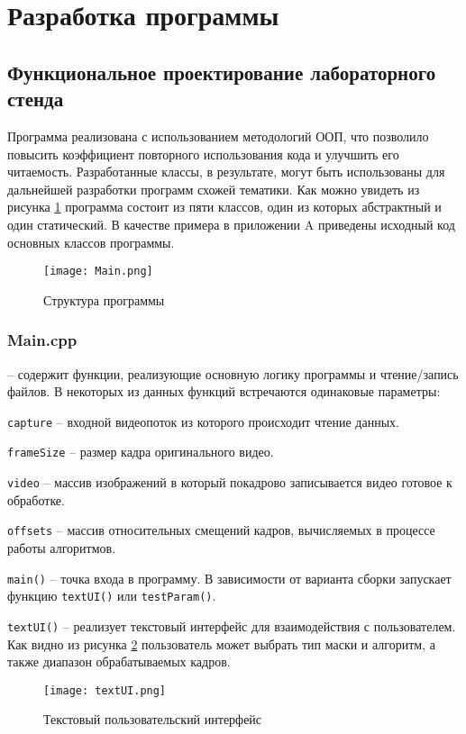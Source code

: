 \section{Разработка программы}
\subsection{Функциональное проектирование лабораторного стенда}
Программа реализована с использованием методологий ООП, что позволило повысить коэффициент повторного использования кода и улучшить его читаемость. Разработанные классы, в результате, могут быть использованы для дальнейшей разработки программ схожей тематики. Как можно увидеть из рисунка \ref{fig:uml} программа состоит из пяти классов, один из которых абстрактный и один статический. В качестве примера в приложении A приведены исходный код основных классов программы.
\begin{figure}[h]
    \centering   
    \texttt{[image: Main.png]} 
    \caption{Структура программы}
    \label{fig:uml}
\end{figure} 

\subsubsection{Main.cpp~}
-- содержит функции, реализующие основную логику программы и чтение/запись файлов. В некоторых из данных функций встречаются одинаковые параметры:

\texttt{capture} -- входной видеопоток из которого происходит чтение данных.

\texttt{frameSize} -- размер кадра оригинального видео.

\texttt{video} -- массив изображений в который покадрово записывается видео готовое к обработке.

\texttt{offsets} -- массив относительных смещений кадров, вычисляемых в процессе работы алгоритмов.

\texttt{main()} -- точка входа в программу. В зависимости от варианта сборки запускает функцию \texttt{textUI()} или \texttt{testParam()}.

\texttt{textUI()} -- реализует текстовый интерфейс для взаимодействия с пользователем. Как видно из рисунка \ref{fig:textUI} пользователь может выбрать тип маски и алгоритм, а также диапазон обрабатываемых кадров.
\begin{figure}[h]
    \centering   
    \texttt{[image: textUI.png]} 
    \caption{Текстовый пользовательский интерфейс}
    \label{fig:textUI}
\end{figure} 

